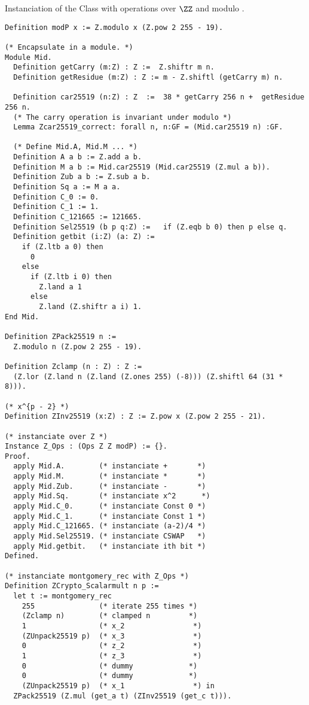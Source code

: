 \documentclass{article}
\begin{document}
\newpage


Instanciation of the Class  with operations over $\ZZ$ and modulo \p.
\begin{lstlisting}[language=Coq]
Definition modP x := Z.modulo x (Z.pow 2 255 - 19).

(* Encapsulate in a module. *)
Module Mid.
  Definition getCarry (m:Z) : Z :=  Z.shiftr m n.
  Definition getResidue (m:Z) : Z := m - Z.shiftl (getCarry m) n.

  Definition car25519 (n:Z) : Z  :=  38 * getCarry 256 n +  getResidue 256 n.
  (* The carry operation is invariant under modulo *)
  Lemma Zcar25519_correct: forall n, n:GF = (Mid.car25519 n) :GF.

  (* Define Mid.A, Mid.M ... *)
  Definition A a b := Z.add a b.
  Definition M a b := Mid.car25519 (Mid.car25519 (Z.mul a b)).
  Definition Zub a b := Z.sub a b.
  Definition Sq a := M a a.
  Definition C_0 := 0.
  Definition C_1 := 1.
  Definition C_121665 := 121665.
  Definition Sel25519 (b p q:Z) :=   if (Z.eqb b 0) then p else q.
  Definition getbit (i:Z) (a: Z) :=
    if (Z.ltb a 0) then
      0
    else
      if (Z.ltb i 0) then
        Z.land a 1
      else
        Z.land (Z.shiftr a i) 1.
End Mid.

Definition ZPack25519 n :=
  Z.modulo n (Z.pow 2 255 - 19).

Definition Zclamp (n : Z) : Z :=
  (Z.lor (Z.land n (Z.land (Z.ones 255) (-8))) (Z.shiftl 64 (31 * 8))).

(* x^{p - 2} *)
Definition ZInv25519 (x:Z) : Z := Z.pow x (Z.pow 2 255 - 21).

(* instanciate over Z *)
Instance Z_Ops : (Ops Z Z modP) := {}.
Proof.
  apply Mid.A.        (* instanciate +       *)
  apply Mid.M.        (* instanciate *       *)
  apply Mid.Zub.      (* instanciate -       *)
  apply Mid.Sq.       (* instanciate x^2      *)
  apply Mid.C_0.      (* instanciate Const 0 *)
  apply Mid.C_1.      (* instanciate Const 1 *)
  apply Mid.C_121665. (* instanciate (a-2)/4 *)
  apply Mid.Sel25519. (* instanciate CSWAP   *)
  apply Mid.getbit.   (* instanciate ith bit *)
Defined.

(* instanciate montgomery_rec with Z_Ops *)
Definition ZCrypto_Scalarmult n p :=
  let t := montgomery_rec
    255               (* iterate 255 times *)
    (Zclamp n)        (* clamped n         *)
    1                 (* x_2                *)
    (ZUnpack25519 p)  (* x_3                *)
    0                 (* z_2                *)
    1                 (* z_3                *)
    0                 (* dummy             *)
    0                 (* dummy             *)
    (ZUnpack25519 p)  (* x_1                *) in
  ZPack25519 (Z.mul (get_a t) (ZInv25519 (get_c t))).
\end{lstlisting}
\end{document}
